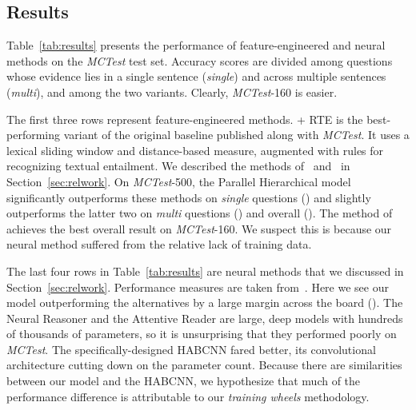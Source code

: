 \documentclass[11pt]{article}
\begin{document}
\subsection{Results}
Table~\ref{tab:results} presents the performance of feature-engineered and neural methods on the {\it MCTest} test set. Accuracy scores are divided among questions whose evidence lies in a single sentence ({\it single}) and across multiple sentences ({\it multi}), and among the two variants. Clearly, {\it MCTest}-160 is easier.

The first three rows represent feature-engineered methods.  + RTE is the best-performing variant of the original baseline published along with {\it MCTest}. It uses a lexical sliding window and distance-based measure, augmented with rules for recognizing textual entailment. We described the methods of~ and~ in Section~\ref{sec:relwork}. On {\it MCTest}-500, the Parallel Hierarchical model significantly outperforms these methods on {\it single} questions () and slightly outperforms the latter two on {\it multi} questions () and overall (). The method of ~ achieves the best overall result on {\it MCTest}-160. We suspect this is because our neural method suffered from the relative lack of training data.

The last four rows in Table~\ref{tab:results} are neural methods that we discussed in Section~\ref{sec:relwork}. Performance measures are taken from~. Here we see our model outperforming the alternatives by a large margin across the board (). The Neural Reasoner and the Attentive Reader are large, deep models with hundreds of thousands of parameters, so it is unsurprising that they performed poorly on {\it MCTest}. The specifically-designed HABCNN fared better, its convolutional architecture cutting down on the parameter count. Because there are similarities between our model and the HABCNN, we hypothesize that much of the performance difference is attributable to our {\it training wheels} methodology.
\end{document}
